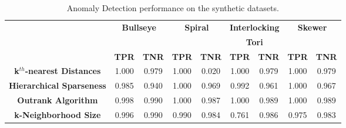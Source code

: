 \begin{table}[!t]
\renewcommand{\arraystretch}{1.3}
\caption{Anomaly Detection performance on the synthetic datasets.}
\label{results:table}
\centering
\begin{tabular}{|c|c|c|c|c|c|c|c|c|}
\hline
 & \multicolumn{2}{c|}{\textbf{Bullseye}} & \multicolumn{2}{c|}{\textbf{Spiral}} & \multicolumn{2}{c|}{\textbf{Interlocking}} & \multicolumn{2}{c|}{\textbf{Skewer}} \\
  & \multicolumn{2}{c|}{\textbf{ }} & \multicolumn{2}{c|}{\textbf{ }} & \multicolumn{2}{c|}{\textbf{Tori}} & \multicolumn{2}{c|}{\textbf{ }} \\
\hline
 & \bfseries TPR & \bfseries TNR & \bfseries TPR & \bfseries TNR & \bfseries TPR & \bfseries TNR & \bfseries TPR & \bfseries TNR \\
\hline
\bfseries k$^{th}$-nearest Distances & 1.000 & 0.979 & 1.000 & 0.020 & 1.000 & 0.979 & 1.000 & 0.979 \\
\hline
\bfseries Hierarchical Sparseness & 0.985 & 0.940 & 1.000 & 0.969 & 0.992 & 0.961 & 1.000 & 0.967 \\
\hline
\bfseries Outrank Algorithm & 0.998 & 0.990 & 1.000 & 0.987 & 1.000 & 0.989 & 1.000 & 0.989 \\
\hline
\bfseries k-Neighborhood Size & 0.996 & 0.990 & 0.990 & 0.984 & 0.761 & 0.986 & 0.975 & 0.983 \\
\hline
\end{tabular}
\end{table}

